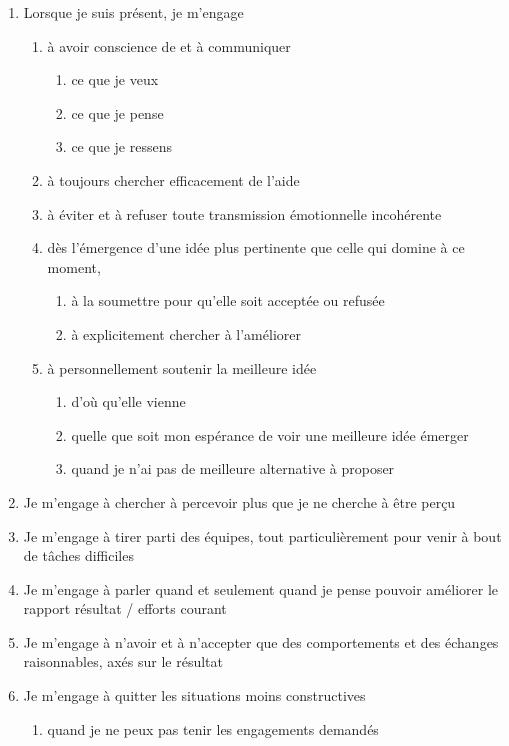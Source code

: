 \documentclass[paper=6in:9in,pagesize=pdftex,headinclude=on,footinclude=on,11pt]{scrbook}
\begin{document}
\begin{enumerate}
	\item Lorsque je suis présent, je m'engage
	\begin{enumerate}
		\item à avoir conscience de et à communiquer
		\begin{enumerate}
			\item ce que je veux
			\item ce que je pense
			\item ce que je ressens
		\end{enumerate}
		\item à toujours chercher efficacement de l'aide
		\item à éviter et à refuser toute transmission émotionnelle incohérente
		\item dès l'émergence d'une idée plus pertinente que celle qui domine
		      à ce moment,
		\begin{enumerate}
			\item à la soumettre pour qu'elle soit acceptée ou refusée
			\item à explicitement chercher à l'améliorer
		\end{enumerate}
		\item à personnellement soutenir la meilleure idée
		\begin{enumerate}
			\item d'où qu'elle vienne
			\item quelle que soit mon espérance de voir une meilleure idée émerger
			\item quand je n'ai pas de meilleure alternative à proposer
		\end{enumerate}
	\end{enumerate}
	\item Je m'engage à chercher à percevoir plus que je ne cherche à être perçu
	\item Je m'engage à tirer parti des équipes, tout particulièrement pour venir à bout de tâches difficiles
	\item Je m'engage à parler quand et seulement quand je pense pouvoir améliorer le rapport \og{}résultat / efforts\fg{} courant
	\item Je m'engage à n'avoir et à n'accepter que des comportements et des échanges raisonnables, axés sur le résultat
	\item Je m'engage à quitter les situations moins constructives
	\begin{enumerate}
		\item quand je ne peux pas tenir les engagements demandés

\end{enumerate}
\end{enumerate}
\end{document}
